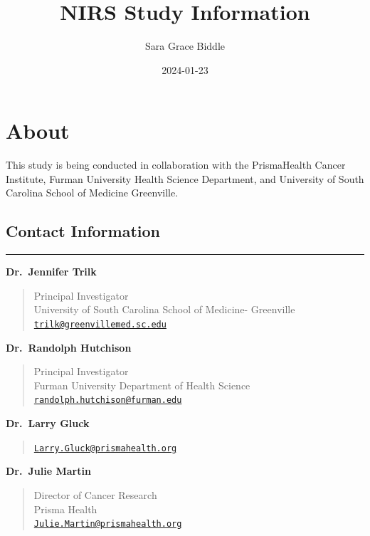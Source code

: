 \documentclass[
]{book}
\title{NIRS Study Information}
\author{Sara Grace Biddle}
\date{2024-01-23}
\begin{document}
\maketitle

{
\setcounter{tocdepth}{1}
\tableofcontents
}
\hypertarget{about}{%
\chapter{About}\label{about}}

This study is being conducted in collaboration with the PrismaHealth Cancer Institute, Furman University Health Science Department, and University of South Carolina School of Medicine Greenville.

\hypertarget{contact-information}{%
\section{Contact Information}\label{contact-information}}

\begin{center}\rule{0.5\linewidth}{0.5pt}\end{center}

\textbf{Dr.~Jennifer Trilk}

\begin{quote}
Principal Investigator\\
University of South Carolina School of Medicine- Greenville\\
\href{mailto:trilk@greenvillemed.sc.edu}{\nolinkurl{trilk@greenvillemed.sc.edu}}
\end{quote}

\textbf{Dr.~Randolph Hutchison}

\begin{quote}
Principal Investigator\\
Furman University Department of Health Science\\
\href{mailto:randolph.hutchison@furman.edu}{\nolinkurl{randolph.hutchison@furman.edu}}
\end{quote}

\textbf{Dr.~Larry Gluck}

\begin{quote}
\href{mailto:Larry.Gluck@prismahealth.org}{\nolinkurl{Larry.Gluck@prismahealth.org}}
\end{quote}

\textbf{Dr.~Julie Martin}

\begin{quote}
Director of Cancer Research\\
Prisma Health\\
\href{mailto:Julie.Martin@prismahealth.org}{\nolinkurl{Julie.Martin@prismahealth.org}}
\end{quote}
\end{document}
